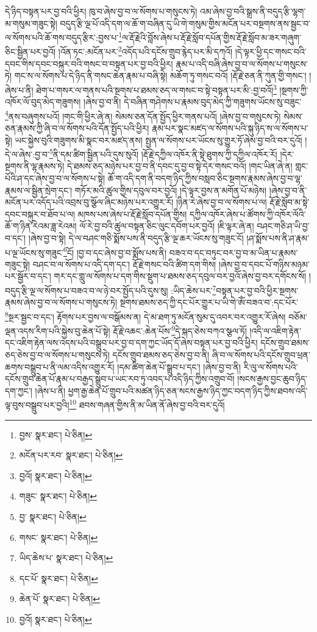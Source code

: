 དེ་ཉིད་བསྟན་པར་བྱ་བའི་ཕྱིར། ཁུ་བ་ཞེས་བྱ་བ་ལ་སོགས་པ་གསུངས་ཏེ། འམ་ཞེས་བྱ་བའི་སྒྲས་ནི་བདུད་རྩི་ལྷག་མ་གསུམ་གཟུང་སྟེ། བདུད་རྩི་ལྔ་པོ་འདི་དག་ལ་ཆོ་ག་བཞིན་དུ་ཡི་གེ་གསུམ་གྱིས་མངོན་པར་བསྔགས་ནས་སྦྱང་བ་ལ་སོགས་པའི་ཆོ་གས་བདུད་རྩིར་:བྱས་པ་\footnote{བྱས་  སྣར་ཐང་།  པེ་ཅིན། }ལ་རྡོ་རྗེའི་བློས་ཞེས་པ་རྡོ་རྗེ་སློབ་དཔོན་གྱིས་རྡོ་རྗེ་སློབ་མ་ཟར་གཞུག་ཅིང་སྦྱིན་པར་བྱའོ། །འོན་ཏང་:མངོན་པར་\footnote{མངོན་པར་རབ་  སྣར་ཐང་།  པེ་ཅིན། }འདོད་པའི་དངོས་གྲུབ་རྙེད་པར་མི་དཀའོ། །དེ་ལྟར་ཕྱི་དང་གསང་བའི་དབང་གིས་དབང་བསྐུར་བའི་གསང་བ་བསྟན་པར་བྱ་བའི་ཕྱིར། རྣམ་པ་འདི་བཞི་ཞེས་བྱ་བ་ལ་སོགས་པ་གསུངས་ཏེ། གང་ས་ལ་སོགས་པ་དེ་ཉིད་ནི་གསང་ཆེན་རྣམ་པ་བཞི་སྟེ། མཆོག་ཏུ་གསང་བའོ། །རྡོ་རྗེ་ཅན་ནི་ཀུན་གྱི་གསང་། །ཞེས་པ་ནི། ཐེག་པ་གསར་ལ་གནས་པའི་སྔགས་པ་ཐམས་ཅད་ལ་གསང་བ་སྟེ་བསྟན་པར་མི་:བྱ་བའོ།\footnote{བྱའོ།  སྣར་ཐང་།  པེ་ཅིན། } །སྔགས་ཀྱི་འཁོར་ལོ་བུད་མེད་གཟུགས། །ཞེས་བྱ་བ་ནི། དེ་བཞིན་གཤེགས་པ་རྣམས་བུད་མེད་ཀྱི་གཟུགས་ཡོངས་སུ་བཟུང་\footnote{གཟུང་  སྣར་ཐང་།  པེ་ཅིན། }ནས་བཞུགས་པའོ། །གང་གི་ཕྱིར་ཞེ་ན། སེམས་ཅན་དོན་སྤྱོད་ཕྱིར་གནས་པའོ། །ཞེས་བྱ་བ་གསུངས་ཏེ། སེམས་ཅན་རྣམས་ཀྱི་ཞི་བ་ལ་སོགས་པའི་དོན་སྤྱོད་པའི་ཕྱིར། རྣམ་པར་སྣང་མཛད་ལ་སོགས་པའི་སྐུ་ཉིད་ས་ལ་སོགས་པ་སྟེ། ཡང་སྐྱེས་བུའི་གཟུགས་མི་སྣང་བར་མཛད་ནས། སྤྱན་ལ་སོགས་པར་ཡོངས་སུ་གྱུར་ཏོ་ཞེས་བྱ་བའི་བར་དུའོ། །དེ་ལ་ཞེས་:བྱ་བ་\footnote{བྱ་  སྣར་ཐང་།  པེ་ཅིན། }ནི་དམ་ཚིག་སྦྱིན་པའི་དུས་སུའོ། །རྡོ་རྗེ་དཀྱིལ་འཁོར་ནི་སྟེ་ཐུགས་ཀྱི་དཀྱིལ་འཁོར་རོ། །དེར་སྔགས་ནི་ལྷ་རྣམས་ཏེ། དེ་ཐམས་ཅད་མཉེས་པར་བྱ་བ་ནི་དབང་དུ་བྱ་བ་སྟེ་དེར་གསང་བའོ། །གང་ཡིན་ཞེ་ན། གླང་པོའི་ཤ་དང་ཞེས་བྱ་བ་ལ་སོགས་པ་སྟེ། ཆོ་ག་འདི་དག་ནི་བདག་ཉིད་ཀྱིས་བསླབ་ཅིང་སྔགས་རྣམས་ཞེས་བྱ་བ་ལྷ་རྣམས་ལ་སྦྱིན་སྲེག་དང་། གཏོར་མའི་ཚུལ་གྱིས་དབུལ་བར་བྱའོ། །དེ་ལྟར་བྱས་ན་མགོན་པོ་མཉེས། །ཞེས་བྱ་བ་ནི་མངོན་པར་འདོད་པའི་འབྲས་བུ་སྩོལ་ཞིང་མཉེས་པར་འགྱུར་རོ། །ཉིན་རེ་ཞེས་བྱ་བ་ལ་སོགས་པ་ལ། རྡོ་རྗེ་སློབ་མ་སྟེ་དབང་བསྐུར་བ་ཐོབ་པ་ལ། མཁས་པས་ཞེས་པ་རྡོ་རྗེ་སློབ་དཔོན་གྱིས། དཀྱིལ་འཁོར་ཞེས་པ་ཚོགས་ཀྱི་འཁོར་ལོའི་ཆོ་ག་ཉིན་རེའམ་ཟླ་རེའམ། ལོ་རེ་བྱ་བའི་ཚུལ་བསྟན་ཅིང་ལུང་དབོག་པར་བྱའོ། །ཇི་ལྟར་ཞེ་ན། བཤང་གཅི་ཤ་ཡི་བྱ་བ་དང་། །ཞེས་བྱ་བ་སྟེ། དེ་ལ་བཤང་གཅི་སྨོས་པས་ནི་བདུད་རྩི་ལྔ་ཆར་ཡོངས་སུ་གཟུང་ངོ། །ཤ་སྨོས་པས་ནི་ཤ་རྣམ་པ་ལྔ་ཡོངས་སུ་གཟུང་\footnote{གསང་  སྣར་ཐང་།  པེ་ཅིན། }ངོ། །བྱ་བ་དང་ཞེས་བྱ་བ་སྨོས་པས་ནི། བཟའ་བ་དང་བཏུང་བར་བྱ་བ་མ་ཡིན་པ་རྣམས་གཟུང་སྟེ། བཤང་བ་ལ་སོགས་པ་འདི་དག་དང་། རྡོ་རྗེ་གསང་བའི་ཚིག་དག་གིས། །ཞེས་བྱ་བ་དབང་པོ་གཉིས་མཉམ་པར་སྦྱོར་བ་དང་། གར་དང་གླུ་ལ་སོགས་པ་དག་གིས་སྡུག་པ་ཐམས་ཅད་དབུལ་བར་བྱའོ་ཞེས་བྱ་བར་དགོངས་སོ། །བདུད་རྩི་ལྔ་ལ་སོགས་པ་བཟའ་བ་ལ་ཉེ་བར་སྤྱོད་པའི་དུས་སུ། :ཡིད་ཆེས་པར་\footnote{ཡིད་ཆེས་པ་  སྣར་ཐང་།  པེ་ཅིན། }བསྟན་པར་བྱ་བའི་ཕྱིར་སྔགས་རྣམས་ཞེས་བྱ་བ་ལ་སོགས་པ་གསུངས་ཏེ། སྔགས་ཐམས་ཅད་ཀྱི་དང་པོར་གྱུར་པ་ཡི་གེ་ཨོཾ་བཟའ་བ་:དང་པོར་\footnote{དང་པོ་  སྣར་ཐང་།  པེ་ཅིན། }སྔར་སྦྱང་བ་དང་། རྟོགས་པར་བྱས་ལ་བསྒོམས་ན། དེ་མ་ཐག་ཏུ་མངོན་སུམ་དུ་འབར་བར་འགྱུར་རོ་ཞེས། བཅོམ་ལྡན་འདས་རིག་པའི་སྐྱེས་བུ་ཆེན་པོ་སྟེ། རྡོ་རྗེ་འཆང་:ཆེན་པོས་\footnote{ཆེན་པོ་  སྣར་ཐང་།  པེ་ཅིན། }དེ་སྐད་ཅེས་བཀའ་སྩལ་ཏོ། །འདི་ལ་འཇིག་རྟེན་དང་འཇིག་རྟེན་ལས་འདས་པའི་བསྒྲུབ་པར་བྱ་བ་དག་ཀྱང་ཡོད་དོ་ཞེས་བསྟན་པར་བྱ་བའི་ཕྱིར། དངོས་གྲུབ་ཐམས་ཅད་ཅེས་བྱ་བ་ལ་སོགས་པ་གསུངས་ཏེ། དངོས་གྲུབ་ཐམས་ཅད་ཅེས་བྱ་བ་ནི། ཞི་བ་ལ་སོགས་པའི་དངོས་གྲུབ་ཕྲན་ཆགས་བསྒྲུབ་པ་ནི་ལམ་འདིས་འགྱུར་རོ། །དམ་ཚིག་ཆེན་པོ་སྒྲུབ་པ་དང་། །ཞེས་བྱ་བ་ནི། རི་ལུ་ལ་སོགས་པའི་དངོས་གྲུབ་ཆེན་པོ་རྣམ་པ་བརྒྱད་སྒྲུབ་པ་ཡང་རབ་ཏུ་འབད་པ་འདི་ཉིད་ཀྱིས་འགྲུབ་བོ། །སངས་རྒྱས་བྱང་ཆུབ་ཉིད་དག་ཀྱང་། །ཞེས་པ་ནི། ཕྱག་རྒྱ་ཆེན་པོ་གྲུབ་པའི་མཚན་ཉིད་ཅན་སངས་རྒྱས་ཉིད་ཀྱང་བདག་ཉིད་ཀྱིས་ཐབས་འདི་ལྟ་བུས་བསྒྲུབ་པར་བྱའི།\footnote{བྱའོ།  སྣར་ཐང་།  པེ་ཅིན། } ཐབས་གཞན་གྱིས་ནི་མ་ཡིན་ནོ་ཞེས་བྱ་བའི་བར་དུའོ། 